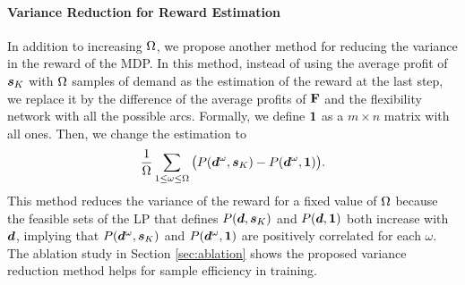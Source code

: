 \documentclass{article} %
\begin{document}
\paragraph{Variance Reduction for Reward Estimation}
In addition to increasing $\Omega$, we propose another method for reducing the variance in the reward of the MDP. In this method, instead of using the average profit of ${\boldsymbol s}_K$ with $\Omega$ samples of demand as the {estimation of the} reward at the last step, we replace it by the difference of the average profits of $\mathbf{F}$ and the flexibility network with all the possible arcs. Formally, 
we define $\mathbf{1}$ as a $m \times n$ matrix with all ones. Then, we change
the estimation to
\begin{equation}\label{eq:rewardwithvarreduction}
\frac{1}{\Omega}\sum_{1 \leq \omega \leq \Omega} \big (P(\boldsymbol{d}^\omega, {\boldsymbol s}_K) - P(\boldsymbol{d}^\omega, \mathbf{1})\big ). 
\end{equation}
This method reduces the variance of the reward for a fixed value of $\Omega$ because the feasible sets of the LP that defines $P(\boldsymbol{d}, {\boldsymbol s}_K)$ and $P(\boldsymbol{d}, \mathbf{1})$ both increase with $\boldsymbol{d}$, implying that $P(\boldsymbol{d}^\omega, {\boldsymbol s}_K)$ and $P(\boldsymbol{d}^\omega, \mathbf{1})$ are positively correlated for each $\omega$. The ablation study in Section \ref{sec:ablation} shows the proposed variance reduction method helps for sample efficiency in training.



\end{document}
